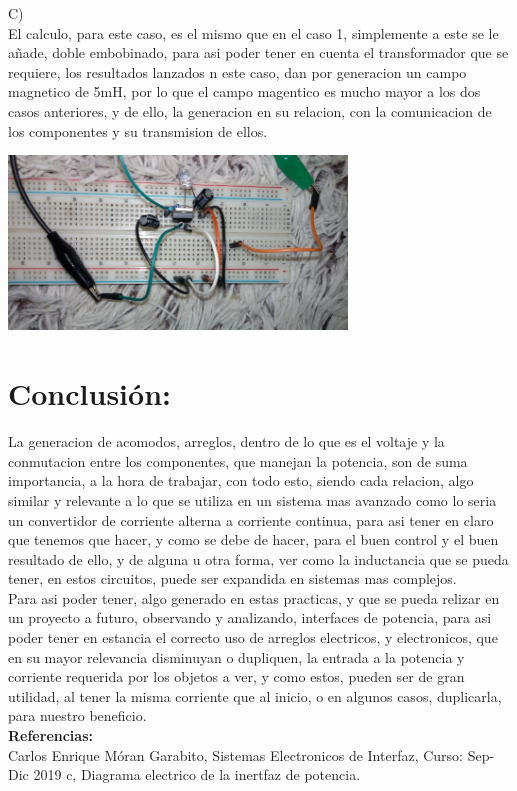 \documentclass[12pt,a4paper]{article}
\begin{document}
C)\\

El calculo, para este caso, es el mismo que en el caso 1, simplemente a este se le añade, doble embobinado, para asi poder tener en cuenta el transformador que se requiere, los resultados lanzados n este caso, dan por generacion un campo magnetico de 5mH, por lo que el campo magentico es mucho mayor a los dos casos anteriores, y de ello, la generacion en su relacion, con la comunicacion de los componentes y su transmision de ellos.

\begin{center}
\includegraphics[width=9cm]{resul3.jpeg} 
\end{center}

\section{Conclusión:}

La generacion de acomodos, arreglos, dentro de lo que es el voltaje y la conmutacion entre los componentes, que manejan la potencia, son de suma importancia, a la hora de trabajar, con todo esto, siendo cada relacion, algo similar y relevante a lo que se utiliza en un  sistema mas avanzado como lo seria un convertidor de corriente alterna a corriente continua, para asi tener en claro que tenemos que hacer, y como se debe de hacer, para el buen control y el buen resultado de ello, y de alguna u otra forma, ver como la inductancia que se pueda tener, en estos circuitos, puede ser expandida en sistemas mas complejos.\\

Para asi poder tener, algo generado en estas practicas, y que se pueda relizar en un proyecto a futuro, observando y analizando, interfaces de potencia, para asi poder tener en estancia el correcto uso de arreglos electricos, y electronicos, que en su mayor relevancia disminuyan o dupliquen, la entrada a la potencia y corriente requerida por los objetos a ver, y como estos, pueden ser de gran utilidad, al tener la misma corriente que al inicio, o en algunos casos, duplicarla, para nuestro beneficio.\\


\textbf{\Large Referencias:}\\
Carlos Enrique Móran Garabito, Sistemas Electronicos de Interfaz, Curso: Sep-Dic 2019 c, Diagrama electrico de la inertfaz de potencia.
\end{document}
